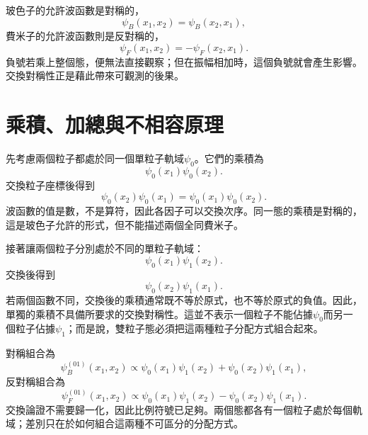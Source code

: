
玻色子的允許波函數是對稱的，
\begin{equation}
\psi_B(x_1,x_2)=\psi_B(x_2,x_1),
\end{equation}
費米子的允許波函數則是反對稱的，
\begin{equation}
\psi_F(x_1,x_2)=-\psi_F(x_2,x_1).
\end{equation}
負號若乘上整個態，便無法直接觀察；但在振幅相加時，這個負號就會產生影響。交換對稱性正是藉此帶來可觀測的後果。

\section{乘積、加總與不相容原理}

先考慮兩個粒子都處於同一個單粒子軌域\(\psi_0\)。它們的乘積為
\begin{equation}
\psi_0(x_1)\psi_0(x_2).
\end{equation}
交換粒子座標後得到
\begin{equation}
\psi_0(x_2)\psi_0(x_1)
=
\psi_0(x_1)\psi_0(x_2).
\end{equation}
波函數的值是數，不是算符，因此各因子可以交換次序。同一態的乘積是對稱的，這是玻色子允許的形式，但不能描述兩個全同費米子。

接著讓兩個粒子分別處於不同的單粒子軌域：
\begin{equation}
\psi_0(x_1)\psi_1(x_2).
\end{equation}
交換後得到
\begin{equation}
\psi_0(x_2)\psi_1(x_1).
\end{equation}
若兩個函數不同，交換後的乘積通常既不等於原式，也不等於原式的負值。因此，單獨的乘積不具備所要求的交換對稱性。這並不表示一個粒子不能佔據\(\psi_0\)而另一個粒子佔據\(\psi_1\)；而是說，雙粒子態必須把這兩種粒子分配方式組合起來。

對稱組合為
\begin{equation}
\psi_B^{(01)}(x_1,x_2)
\propto
\psi_0(x_1)\psi_1(x_2)
+
\psi_0(x_2)\psi_1(x_1),
\end{equation}
反對稱組合為
\begin{equation}
\psi_F^{(01)}(x_1,x_2)
\propto
\psi_0(x_1)\psi_1(x_2)
-
\psi_0(x_2)\psi_1(x_1).
\end{equation}
交換論證不需要歸一化，因此比例符號已足夠。兩個態都各有一個粒子處於每個軌域；差別只在於如何組合這兩種不可區分的分配方式。


